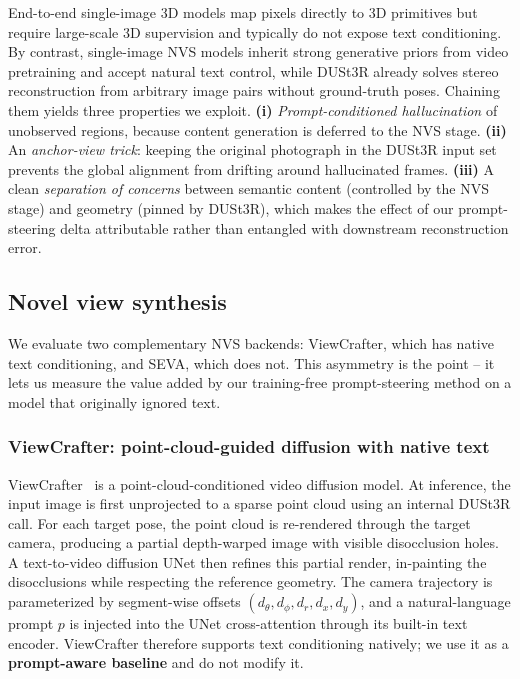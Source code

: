 \documentclass{article}
\begin{document}
End-to-end single-image 3D models map pixels directly to 3D primitives
but require large-scale 3D supervision and typically do not expose text
conditioning. By contrast, single-image NVS models inherit strong
generative priors from video pretraining and accept natural text control,
while DUSt3R already solves stereo reconstruction from arbitrary image
pairs without ground-truth poses. Chaining them yields three properties
we exploit. \textbf{(i)} \emph{Prompt-conditioned hallucination} of
unobserved regions, because content generation is deferred to the NVS
stage. \textbf{(ii)} An \emph{anchor-view trick}: keeping the original
photograph in the DUSt3R input set prevents the global alignment from
drifting around hallucinated frames. \textbf{(iii)} A clean
\emph{separation of concerns} between semantic content (controlled by
the NVS stage) and geometry (pinned by DUSt3R), which makes the effect
of our prompt-steering delta attributable rather than entangled with
downstream reconstruction error.

\subsection{Novel view synthesis}
\label{sec:method-nvs}

We evaluate two complementary NVS backends: ViewCrafter, which has
native text conditioning, and SEVA, which does not. This asymmetry is
the point -- it lets us measure the value added by our training-free
prompt-steering method on a model that originally ignored text.

\subsubsection{ViewCrafter: point-cloud-guided diffusion with native text}
\label{sec:method-viewcrafter}

ViewCrafter~\cite{viewcrafter} is a point-cloud-conditioned video
diffusion model. At inference, the input image is first unprojected to
a sparse point cloud using an internal DUSt3R call. For each target
pose, the point cloud is re-rendered through the target camera,
producing a partial depth-warped image with visible disocclusion holes.
A text-to-video diffusion UNet then refines this partial render,
in-painting the disocclusions while respecting the reference geometry.
The camera trajectory is parameterized by segment-wise offsets
$(d_\theta, d_\phi, d_r, d_x, d_y)$, and a natural-language prompt $p$
is injected into the UNet cross-attention through its built-in text
encoder. ViewCrafter therefore supports text conditioning natively; we
use it as a \textbf{prompt-aware baseline} and do not modify it.
\end{document}
